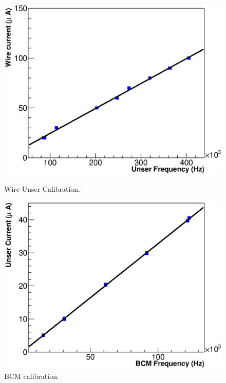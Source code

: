 \documentclass[preprint,12pt]{elsarticle}
\begin{document}
\begin{figure}[htbp]
  \begin{minipage}[b]{0.5\linewidth}
    \centering
    \includegraphics[width=\linewidth]{images/unser_calibration.eps}
    \caption{Wire Unser Calibration.}
    \label{fig:unser_cal}
  \end{minipage}
  \hspace{0.5cm}
  \begin{minipage}[b]{0.5\linewidth}
    \centering
    \includegraphics[width=\linewidth]{images/dnew_calibration.eps}
    \caption{BCM calibration.}
    \label{fig:dnew_cal}
  \end{minipage}
\end{figure}
\end{document}
